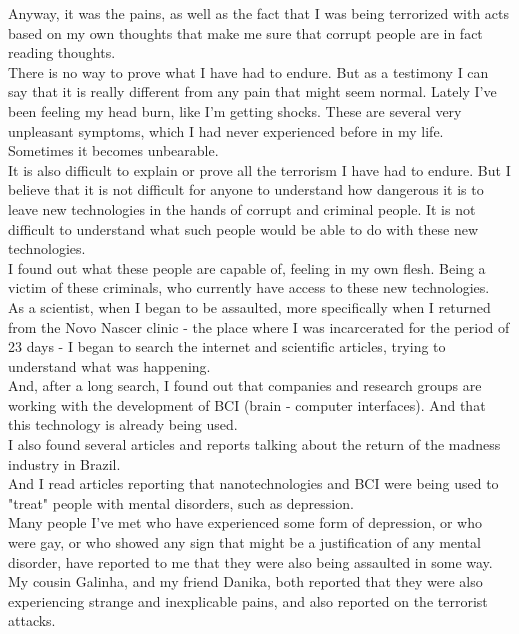 \documentclass[11pt]{book}
\begin{document}
\noindent Anyway, it was the pains, as well as the fact that I was being terrorized with acts based on my own thoughts that make me sure that corrupt people are in fact reading thoughts. \\

\noindent There is no way to prove what I have had to endure. But as a testimony I can say that it is really different from any pain that might seem normal. Lately I've been feeling my head burn, like I'm getting shocks. These are several very unpleasant symptoms, which I had never experienced before in my life. Sometimes it becomes unbearable. \\

\noindent It is also difficult to explain or prove all the terrorism I have had to endure. 
But I believe that it is not difficult for anyone to understand how dangerous it is to leave new technologies in the hands of corrupt and criminal people. It is not difficult to understand what such people would be able to do with these new technologies. \\

\noindent I found out what these people are capable of, feeling in my own flesh. Being a victim of these criminals, who currently have access to these new technologies. \\

\noindent As a scientist, when I began to be assaulted, more specifically when I returned from the Novo Nascer clinic - the place where I was incarcerated for the period of 23 days - I began to search the internet and scientific articles, trying to understand what was happening. \\

\noindent And, after a long search, I found out that companies and research groups are working with the development of BCI (brain - computer interfaces). And that this technology is already being used. \\

\noindent I also found several articles and reports talking about the return of the madness industry in Brazil. \\

\noindent And I read articles reporting that nanotechnologies and BCI were being used to "treat" people with mental disorders, such as depression. \\

\noindent Many people I've met who have experienced some form of depression, or who were gay, or who showed any sign that might be a justification of any mental disorder, have reported to me that they were also being assaulted in some way. My cousin Galinha, and my friend Danika, both reported that they were also experiencing strange and inexplicable pains, and also reported on the terrorist attacks. \\
\end{document}

